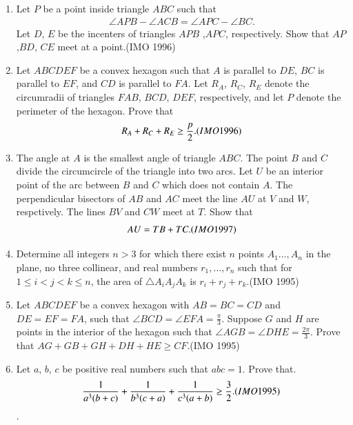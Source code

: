 \begin{enumerate}
\item Let $P$ be a point inside triangle $ABC$ such     that                                         
\begin{align}                                      
	\angle{APB}-\angle{ACB}=\angle{APC}-\angle{ BC}.
 \end{align}                                       
Let $D$, $E$ be the incenters of triangles $APB$ ,$APC$, respectively. Show that $AP$ ,$BD$, $CE$ meet at a point.\hfill(IMO 1996)
\item Let $ABCDEF$ be a convex hexagon such that $A$ is parallel to $DE$, $BC$ is parallel to $EF$, and $CD$ is parallel to $FA$. Let $R_A$, $R_C$, $R_E$ denote the circumradii of triangles $FAB$, $BCD$, $DEF$, respectively, and let $P$ denote the perimeter of the hexagon. Prove that            
\begin{align}                                            R_A+R_C+R_E\geq\frac{p}{2}.\hfill(IMO 1996)  
\end{align}
\item The angle at $A$ is the smallest angle of triangle $ABC$. The point $B$ and $C$ divide the circumcircle of the triangle into two arcs. Let $U$ be an interior point of the arc between $B$ and $C$ which does not contain $A$. The perpendicular bisectors of  $AB$ and $AC$ meet the line $AU$ at $V$ and $W$, respctively. The lines $BV$ and $CW$ meet at $T$. Show that
 \begin{align}
AU=TB+TC.\hfill(IMO 1997)
 \end{align}                                   
\item Determine all integers $n>3$ for which there exist $n$ points $A_1\dots,A_n$ in the plane, no three collinear, and real numbers $r_1,\dots,r_n$ such that for $1\leq{i}<{j}<{k}\leq{n}$, the area of $\triangle A_iA_jA_k$ is $r_i+r_j+r_k$.\hfill(IMO 1995)
\item Let $ABCDEF$ be a convex hexagon with $AB=BC=CD$ and $DE=EF=FA$, such that $\angle{BCD}=\angle{EFA}=\frac{\pi}{3}$. Suppose $G$ and $H$ are points in the interior of the hexagon such that $\angle{AGB}=\angle{DHE}=\frac{2\pi}{3}$. Prove that $AG+GB+GH+DH+HE\geq CF$.\hfill (IMO 1995)
\item Let $a$, $b$, $c$ be positive real numbers such that $abc=1$. Prove that.
\begin{align}
\frac{1}{a^3(b+c)}+\frac{1}{b^3(c+a)}+\frac{1}{c^3(a+b)}\geq\frac{3}{2}.\hfill(IMO 1995)
 \end{align}.

\end{enumerate}
